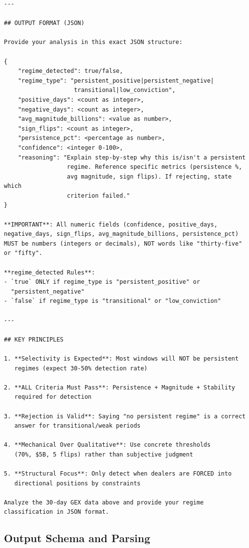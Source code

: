 \begin{verbatim}
---

## OUTPUT FORMAT (JSON)

Provide your analysis in this exact JSON structure:

{
    "regime_detected": true/false,
    "regime_type": "persistent_positive|persistent_negative|
                    transitional|low_conviction",
    "positive_days": <count as integer>,
    "negative_days": <count as integer>,
    "avg_magnitude_billions": <value as number>,
    "sign_flips": <count as integer>,
    "persistence_pct": <percentage as number>,
    "confidence": <integer 0-100>,
    "reasoning": "Explain step-by-step why this is/isn't a persistent
                  regime. Reference specific metrics (persistence %,
                  avg magnitude, sign flips). If rejecting, state which
                  criterion failed."
}

**IMPORTANT**: All numeric fields (confidence, positive_days,
negative_days, sign_flips, avg_magnitude_billions, persistence_pct)
MUST be numbers (integers or decimals), NOT words like "thirty-five"
or "fifty".

**regime_detected Rules**:
- `true` ONLY if regime_type is "persistent_positive" or
  "persistent_negative"
- `false` if regime_type is "transitional" or "low_conviction"

---

## KEY PRINCIPLES

1. **Selectivity is Expected**: Most windows will NOT be persistent
   regimes (expect 30-50% detection rate)

2. **ALL Criteria Must Pass**: Persistence + Magnitude + Stability
   required for detection

3. **Rejection is Valid**: Saying "no persistent regime" is a correct
   answer for transitional/weak periods

4. **Mechanical Over Qualitative**: Use concrete thresholds
   (70%, $5B, 5 flips) rather than subjective judgment

5. **Structural Focus**: Only detect when dealers are FORCED into
   directional positions by constraints

Analyze the 30-day GEX data above and provide your regime
classification in JSON format.
\end{verbatim}

\subsection{Output Schema and Parsing}
\label{app:prompt:output}

